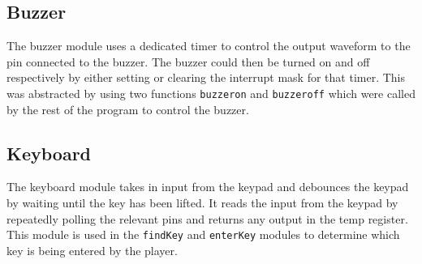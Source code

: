 \documentclass[a4paper]{article}
\begin{document}
\subsection{Buzzer}
The buzzer module uses a dedicated timer to control the output waveform to the pin connected to
the buzzer. The buzzer could then be turned on and off respectively by either setting or clearing the interrupt
mask for that timer. This was abstracted by using two functions \verb|buzzeron| and \verb|buzzeroff| which were
called by the rest of the program to control the buzzer.

\subsection{Keyboard}
The keyboard module takes in input from the keypad and debounces the keypad by waiting until the key has been
lifted. It reads the input from the keypad by repeatedly polling the relevant pins and returns any output 
in the temp register. This module is used in the \verb|findKey| and \verb|enterKey| modules to determine which 
key is being entered by the player.
\end{document}
